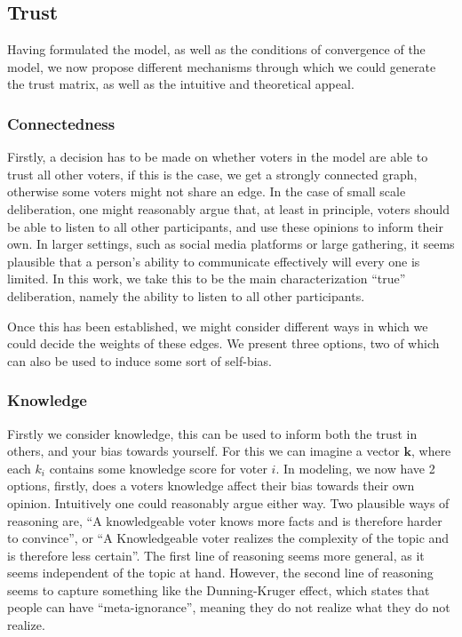 \subsection{Trust} Having formulated the model, as well as the conditions of
convergence of the model, we now propose different mechanisms through which we
could generate the trust matrix, as well as the intuitive and theoretical
appeal.

\subsubsection{Connectedness} Firstly, a decision has to be made on whether
voters in the model are able to trust all other voters, if this is the case, we
get a strongly connected graph, otherwise some voters might not share an edge.
In the case of small scale deliberation, one might reasonably argue that, at
least in principle, voters should be able to listen to all other participants,
and use these opinions to inform their own. In larger settings, such as social
media platforms or large gathering, it seems plausible that a person's ability
to communicate effectively will every one is limited. In this work, we take
this to be the main characterization ``true'' deliberation, namely the ability
to listen to all other participants.

Once this has been established, we might consider different ways in which we 
could decide the weights of these edges. We present three options, two of which
can also be used to induce some sort of self-bias.

\subsubsection{Knowledge} Firstly we consider knowledge, this can be used to
inform both the trust in others, and your bias towards yourself. For this we
can imagine a vector $\boldsymbol{k}$, where each $k_i$ contains some knowledge
score for voter $i$. In modeling, we now have 2 options, firstly, does a voters
knowledge affect their bias towards their own opinion. Intuitively one could
reasonably argue either way. Two plausible ways of reasoning are, ``A
knowledgeable voter knows more facts and is therefore harder to convince'', or
``A Knowledgeable voter realizes the complexity of the topic and is therefore
less certain''. The first line of reasoning seems more general, as it seems 
independent of the topic at hand. However, the second line of reasoning seems 
to capture something like the Dunning-Kruger effect, which states that people 
can have ``meta-ignorance'', meaning they do not realize what they do not realize.

